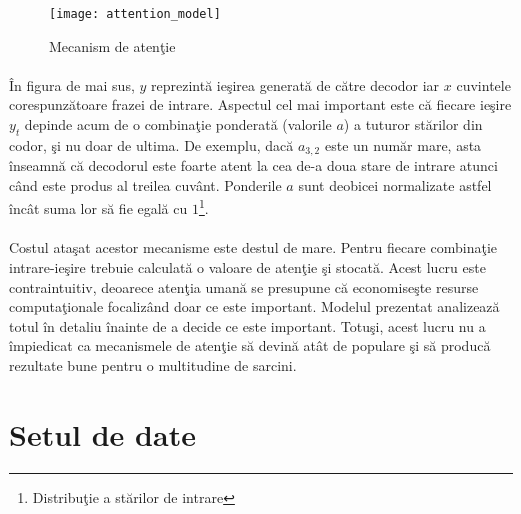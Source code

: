 \begin{figure}[H]
\centering
\texttt{[image: attention\_model]}
\caption{Mecanism de aten\c tie}
\end{figure}

\paragraph{}
\^ In figura de mai sus, \(y\) reprezint\u a ie\c sirea generat\u a de c\u atre decodor iar \(x\) cuvintele corespunz\u atoare frazei de intrare. Aspectul cel mai important este c\u a fiecare ie\c sire \(y_t\) depinde acum de o combina\c tie ponderat\u a (valorile \(a\)) a tuturor st\u arilor din codor, \c si nu doar de ultima. De exemplu, dac\u a \(a_{3,2}\) este un num\u ar mare, asta \^ inseamn\u a c\u a decodorul este foarte atent la cea de-a doua stare de intrare atunci c\^ and este produs al treilea cuv\^ ant. Ponderile \(a\) sunt deobicei normalizate astfel \^ inc\^ at suma lor s\u a fie egal\u a cu \(1\)\footnote{Distribu\c tie a st\u arilor de intrare}. 

\paragraph{}
Costul ata\c sat acestor mecanisme este destul de mare. Pentru fiecare combina\c tie intrare-ie\c sire trebuie calculat\u a o valoare de aten\c tie \c si stocat\u a. Acest lucru este contraintuitiv, deoarece aten\c tia uman\u a se presupune c\u a economise\c ste resurse computa\c tionale focaliz\^ and doar ce este important. Modelul prezentat analizeaz\u a totul \^ in detaliu \^ inainte de a decide ce este important. Totu\c si, acest lucru nu a \^ impiedicat ca mecanismele de aten\c tie s\u a devin\u a at\^ at de populare \c si s\u a produc\u a rezultate bune pentru o multitudine de sarcini.

\section{Setul de date}

